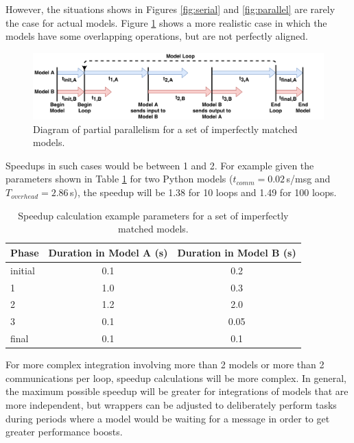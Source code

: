 \documentclass[journal]{IEEEtran}
\begin{document}
However, the situations shows in Figures \ref{fig:serial} and \ref{fig:parallel} are rarely the case for actual models. Figure \ref{fig:partial} shows a more realistic case in which the models have some overlapping operations, but are not perfectly aligned. 
%
\ifinclfig
 	\begin{figure}[htbp]
	\begin{center}
	\includegraphics[width=\columnwidth,keepaspectratio]{./images/Parallelism-PartiallyParallel.png}
	\caption{Diagram of partial parallelism for a set of imperfectly matched models.}
	\label{fig:partial}
	\end{center}
	\end{figure}
\fi
%
Speedups in such cases would be between 1 and 2. For example given the parameters shown in Table \ref{tab:partial} for two Python models ($t_{comm} = 0.02$\,s/msg and $T_{overhead} = 2.86$\,s), the speedup will be 1.38 for 10 loops and 1.49 for 100 loops.
%
\begin{table}[h]
\caption{Speedup calculation example parameters for a set of imperfectly matched models.}
\begin{center}
\begin{tabular}{|l|c|c|}
\hline
Phase 	& Duration in Model A (s) & Duration in Model B (s) \\\hline
initial		& 0.1 	& 0.2 \\
1		& 1.0		& 0.3 \\
2		& 1.2		& 2.0 \\
3		& 0.1		& 0.05 \\
final		& 0.1		& 0.1 \\
\hline
\end{tabular}
\end{center}
\label{tab:partial}
\end{table}%
%

For more complex integration involving more than 2 models or more than 2 communications per loop, speedup calculations will be more complex. In general, the maximum possible speedup will be greater for integrations of models that are more independent, but wrappers can be adjusted to deliberately perform tasks during periods where a model would be waiting for a message in order to get greater performance boosts.
\end{document}
